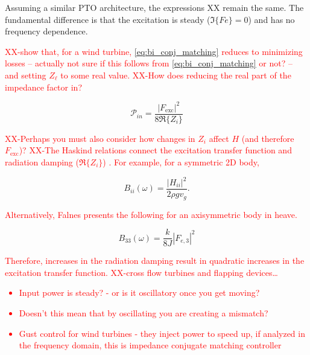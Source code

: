 \documentclass[lettersize,journal]{IEEEtran}
\newcommand{\rc}[1]{\textcolor{red}{#1}}
\begin{document}
Assuming a similar PTO architecture, the expressions XX remain the same.
The fundamental difference is that the excitation is steady ($\Im \{ Fe \} = 0$) and has no frequency dependence.

\rc{
XX-show that, for a wind turbine, \eqref{eq:bi_conj_matching} reduces to minimizing losses -- actually not sure if this follows from \eqref{eq:bi_conj_matching} or not? -- and setting $Z_\ell$ to some real value.
XX-How does reducing the real part of the impedance factor in?}

\begin{equation}
        \mathcal{P}_{in} = \frac{ | F_{\textrm{exc}} |^2 }{8 \Re \{ Z_i \}}
\end{equation}

\rc{XX-Perhaps you must also consider how changes in $Z_i$ affect $H$ (and therefore $F_{\textrm{exc}}$)?
XX-The Haskind relations connect the excitation transfer function and radiation damping ($\Re \{ Z_i \}$) \cite[pg. 304]{Newman:1978aa}.
For example, for a symmetric 2D body,}

\begin{equation}
        B_{ii}(\omega) = \frac{| H_{ii} |^2}{2 \rho g v_g} .
\end{equation}

\rc{
\noindent{}Alternatively, Falnes presents \cite[pg. 149]{Falnes:2002aa} the following for an axisymmetric body in heave.}

\begin{equation}
        B_{33}(\omega) = \frac{k}{8J} | F_{e,3} |^2
\end{equation}

\rc{
\noindent{}Therefore, increases in the radiation damping result in quadratic increases in the excitation transfer function.
XX-cross flow turbines and flapping devices\dots{}
\begin{itemize}
        \item Input power is steady? - or is it oscillatory once you get moving?
        \item Doesn't this mean that by oscillating you are creating a mismatch?
        \item Gust control for wind turbines - they inject power to speed up, if analyzed in the frequency domain, this is impedance conjugate matching controller
\end{itemize}}


\end{document}

